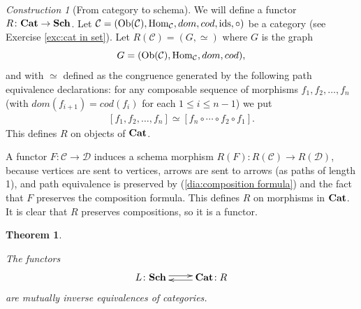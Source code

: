 \documentclass{book}
\def\tn{\textnormal}
\def\mc{\mathcal}
\def\Hom{\tn{Hom}}
\def\Ob{\tn{Ob}}
\def\to{\rightarrow}
\def\taking{\colon}
\def\ids{\tn{ids}}
\def\Cat{{\bf Cat}}
\def\mcC{\mc{C}}
\def\mcD{\mc{D}}
\newtheorem{theorem}[subsubsection]{Theorem}
\theoremstyle{remark}
\newtheorem{construction}[subsubsection]{Construction}
\theoremstyle{definition}
\def\Sch{{\bf Sch}}
\begin{document}
\begin{construction}[From category to schema]

We will define a functor $R\taking\Cat\to\Sch$.\index{a functor!$\Cat\to\Sch$} Let $\mcC=(\Ob(\mcC),\Hom_\mcC,dom,cod,\ids,\circ)$ be a category (see Exercise \ref{exc:cat in set}). Let $R(\mcC)=(G,\simeq)$ where $G$ is the graph $$G=(\Ob(\mcC),\Hom_\mcC,dom,cod),$$ and with $\simeq$ defined as the congruence generated by the following path equivalence declarations: for any composable sequence of morphisms $f_1,f_2,\ldots,f_n$ (with $dom(f_{i+1})=cod(f_i)$ for each $1\leq i\leq n-1$) we put 
\begin{align}\label{dia:composition formula}
[f_1,f_2,\ldots,f_n]\simeq [f_n\circ\cdots\circ f_2\circ f_1].
\end{align} 
This defines $R$ on objects of $\Cat$. 

A functor $F\taking\mcC\to\mcD$ induces a schema morphism $R(F)\taking R(\mcC)\to R(\mcD)$, because vertices are sent to vertices, arrows are sent to arrows (as paths of length 1), and path equivalence is preserved by (\ref{dia:composition formula}) and the fact that $F$ preserves the composition formula. This defines $R$ on morphisms in $\Cat$. It is clear that $R$ preserves compositions, so it is a functor.

\end{construction}

\begin{theorem}\label{thm:equivalence of categories and schemas}

The functors $$\xymatrix{L\taking\Sch\ar@<.5ex>[r]&\Cat\!:R\ar@<.5ex>[l]}$$ are mutually inverse equivalences of categories.

\end{theorem}
\end{document}
